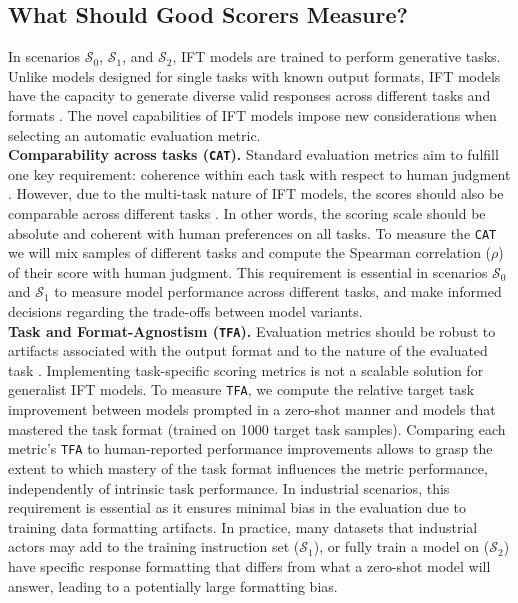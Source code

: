 \subsection{What Should Good Scorers Measure?}
\label{sec:evalreq}
In scenarios $\mathcal{S}_0$, $\mathcal{S}_1$, and $\mathcal{S}_2$, IFT models are trained to perform generative tasks. Unlike models designed for single tasks with known output formats, IFT models have the capacity to generate diverse valid responses across different tasks and formats . The novel capabilities of IFT models impose new considerations when selecting an automatic evaluation metric. 
\\\noindent \textbf{Comparability across tasks (\texttt{CAT}).}
Standard evaluation metrics aim to fulfill one key requirement: coherence within each task with respect to human judgment . However, due to the multi-task nature of IFT models, the scores should also be comparable across different tasks . In other words, the scoring scale should be absolute and coherent with human preferences on all tasks. To measure the \texttt{CAT} we will mix samples of different tasks and compute the Spearman correlation ($\rho$) of their score with human judgment. 
This requirement is essential in scenarios $\mathcal{S}_0$ and $\mathcal{S}_1$ to measure model performance across different tasks, and make informed decisions regarding the trade-offs between model variants.
\\\noindent \textbf{Task and Format-Agnostism (\texttt{TFA}).} Evaluation metrics should be robust to artifacts associated with the output format and to the nature of the evaluated task . Implementing task-specific scoring metrics is not a scalable solution for generalist IFT models. To measure \texttt{TFA}, we compute the relative target task improvement between models prompted in a zero-shot manner and models that mastered the task format (trained on 1000 target task samples). Comparing each metric's \texttt{TFA} to human-reported performance improvements allows to grasp the extent to which mastery of the task format influences the metric performance, independently of intrinsic task performance.
 In industrial scenarios, this requirement is essential as it ensures minimal bias in the evaluation due to training data formatting artifacts. In practice, many datasets that industrial actors may add to the training instruction set ($\mathcal{S}_1$), or fully train a model on ($\mathcal{S}_2$) have specific response formatting that differs from what a zero-shot model will answer, leading to a potentially large formatting bias.

